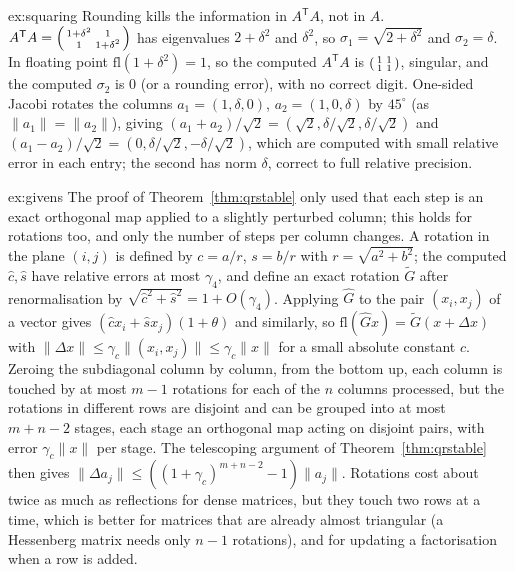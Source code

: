 \begin{solution}{ex:squaring}
\idea Rounding kills the information in $A^{\mathsf T}A$, not in $A$.
\writeup $A^{\mathsf T}A=\begin{psmallmatrix}1+\delta^2&1\\1&1+\delta^2\end{psmallmatrix}$ has eigenvalues $2+\delta^2$ and $\delta^2$, so $\sigma_1=\sqrt{2+\delta^2}$ and
$\sigma_2=\delta$. In floating point $\mathrm{fl}(1+\delta^2)=1$, so the computed $A^{\mathsf T}A$ is $\begin{psmallmatrix}1&1\\1&1\end{psmallmatrix}$, singular, and the
computed $\sigma_2$ is $0$ (or a rounding error), with no correct digit. One-sided Jacobi rotates the columns $a_1=(1,\delta,0)$, $a_2=(1,0,\delta)$ by $45^\circ$
(as $\|a_1\|=\|a_2\|$), giving $(a_1+a_2)/\sqrt2=(\sqrt2,\delta/\sqrt2,\delta/\sqrt2)$ and $(a_1-a_2)/\sqrt2=(0,\delta/\sqrt2,-\delta/\sqrt2)$, which are computed with small
relative error in each entry; the second has norm $\delta$, correct to full relative precision.
\end{solution}

\begin{solution}{ex:givens}
\idea The proof of Theorem~\ref{thm:qrstable} only used that each step is an exact orthogonal map applied to a slightly perturbed column; this holds for rotations
too, and only the number of steps per column changes.
\writeup A rotation in the plane $(i,j)$ is defined by $c=a/r$, $s=b/r$ with $r=\sqrt{a^2+b^2}$; the computed $\hat c,\hat s$ have relative errors at most
$\gamma_4$, and define an exact rotation $\tilde G$ after renormalisation by $\sqrt{\hat c^2+\hat s^2}=1+O(\gamma_4)$. Applying $\hat G$ to the pair $(x_i,x_j)$ of a
vector gives $(\hat cx_i+\hat sx_j)(1+\theta)$ and similarly, so $\mathrm{fl}(\hat Gx)=\tilde G(x+\Delta x)$ with $\|\Delta x\|\le\gamma_{c}\|(x_i,x_j)\|\le\gamma_c\|x\|$
for a small absolute constant $c$. Zeroing the subdiagonal column by column, from the bottom up, each column is touched by at most $m-1$ rotations for each of the
$n$ columns processed, but the rotations in different rows are disjoint and can be grouped into at most $m+n-2$ stages, each stage an orthogonal map acting on
disjoint pairs, with error $\gamma_c\|x\|$ per stage. The telescoping argument of Theorem~\ref{thm:qrstable} then gives $\|\Delta a_j\|\le((1+\gamma_c)^{m+n-2}-1)\|a_j\|$.
Rotations cost about twice as much as reflections for dense matrices, but they touch two rows at a time, which is better for matrices that are already almost
triangular (a Hessenberg matrix needs only $n-1$ rotations), and for updating a factorisation when a row is added.
\end{solution}

